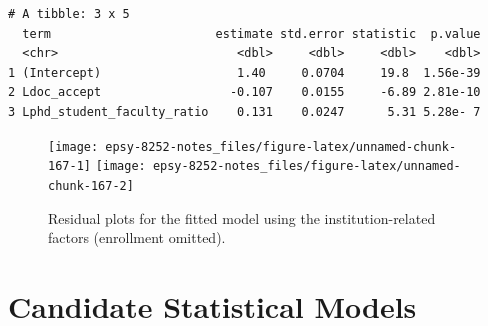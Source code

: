 \documentclass[]{book}
\newenvironment{Shaded}{\begin{snugshade}}{\end{snugshade}}
\newcommand{\CommentTok}[1]{\textcolor[rgb]{0.56,0.35,0.01}{\textit{#1}}}
\newcommand{\DataTypeTok}[1]{\textcolor[rgb]{0.13,0.29,0.53}{#1}}
\newcommand{\DecValTok}[1]{\textcolor[rgb]{0.00,0.00,0.81}{#1}}
\newcommand{\FloatTok}[1]{\textcolor[rgb]{0.00,0.00,0.81}{#1}}
\newcommand{\KeywordTok}[1]{\textcolor[rgb]{0.13,0.29,0.53}{\textbf{#1}}}
\newcommand{\NormalTok}[1]{#1}
\newcommand{\OperatorTok}[1]{\textcolor[rgb]{0.81,0.36,0.00}{\textbf{#1}}}
\newcommand{\StringTok}[1]{\textcolor[rgb]{0.31,0.60,0.02}{#1}}
\begin{document}
\begin{verbatim}
# A tibble: 3 x 5
  term                       estimate std.error statistic  p.value
  <chr>                         <dbl>     <dbl>     <dbl>    <dbl>
1 (Intercept)                   1.40     0.0704     19.8  1.56e-39
2 Ldoc_accept                  -0.107    0.0155     -6.89 2.81e-10
3 Lphd_student_faculty_ratio    0.131    0.0247      5.31 5.28e- 7
\end{verbatim}

\begin{Shaded}
\end{Shaded}

\begin{figure}

{\centering \texttt{[image: epsy-8252-notes\_files/figure-latex/unnamed-chunk-167-1]} \texttt{[image: epsy-8252-notes\_files/figure-latex/unnamed-chunk-167-2]} 

}

\caption{Residual plots for the fitted model using the institution-related factors (enrollment omitted).}\label{fig:unnamed-chunk-167}
\end{figure}

\hypertarget{candidate-statistical-models}{%
\section{Candidate Statistical Models}\label{candidate-statistical-models}}
\end{document}
